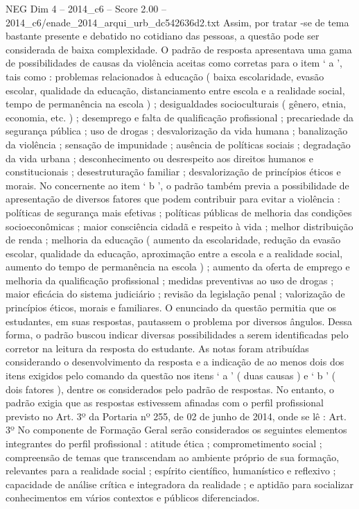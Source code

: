 \begin{textsample}{NEG Dim 4 – 2014\_c6 – Score 2.00 – 2014\_c6/enade\_2014\_arqui\_urb\_dc542636d2.txt}
Assim, por tratar -se de tema bastante presente e debatido no cotidiano das pessoas, a questão pode ser considerada de baixa complexidade.
O padrão de resposta apresentava uma gama de possibilidades de causas da violência aceitas como corretas para o item ‘ a ’, tais como : problemas relacionados à educação ( baixa escolaridade, evasão escolar, qualidade da educação, distanciamento entre escola e a realidade social, tempo de permanência na escola ) ; desigualdades socioculturais ( gênero, etnia, economia, etc. ) ; desemprego e falta de qualificação profissional ; precariedade da segurança pública ; uso de drogas ; desvalorização da vida humana ; banalização da violência ; sensação de impunidade ; ausência de políticas sociais ; degradação da vida urbana ; desconhecimento ou desrespeito aos direitos humanos e constitucionais ; desestruturação familiar ; desvalorização de princípios éticos e morais.
No concernente ao item ‘ b ’, o padrão também previa a possibilidade de apresentação de diversos fatores que podem contribuir para evitar a violência : políticas de segurança mais efetivas ; políticas públicas de melhoria das condições socioeconômicas ; maior consciência cidadã e respeito à vida ; melhor distribuição de renda ; melhoria da educação ( aumento da escolaridade, redução da evasão escolar, qualidade da educação, aproximação entre a escola e a realidade social, aumento do tempo de permanência na escola ) ; aumento da oferta de emprego e melhoria da qualificação profissional ; medidas preventivas ao uso de drogas ; maior eficácia do sistema judiciário ; revisão da legislação penal ; valorização de princípios éticos, morais e familiares.
O enunciado da questão permitia que os estudantes, em suas respostas, pautassem o problema por diversos ângulos.
Dessa forma, o padrão buscou indicar diversas possibilidades a serem identificadas pelo corretor na leitura da resposta do estudante.
As notas foram atribuídas considerando o desenvolvimento da resposta e a indicação de ao menos dois dos itens exigidos pelo comando da questão nos itens ‘ a ’ ( duas causas ) e ‘ b ’ ( dois fatores ), dentre os considerados pelo padrão de respostas.
No entanto, o padrão exigia que as respostas estivessem afinadas com o perfil profissional previsto no Art. 3º da Portaria nº 255, de 02 de junho de 2014, onde se lê : Art. 3º No componente de Formação Geral serão considerados os seguintes elementos integrantes do perfil profissional : atitude ética ; comprometimento social ; compreensão de temas que transcendam ao ambiente próprio de sua formação, relevantes para a realidade social ; espírito científico, humanístico e reflexivo ; capacidade de análise crítica e integradora da realidade ; e aptidão para socializar conhecimentos em vários contextos e públicos diferenciados.

\end{textsample}
